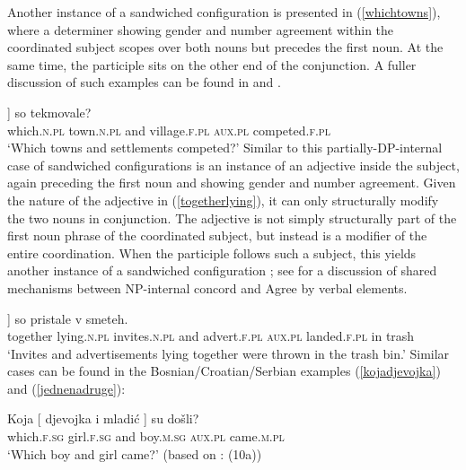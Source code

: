 \documentclass[output=paper
,modfonts
,nonflat]{langsci/langscibook}
\begin{document}
Another instance of a sandwiched configuration is presented in (\ref{whichtowns}), where a determiner showing gender and number agreement within the coordinated subject scopes over both nouns but precedes the first noun. At the same time, the participle sits on the other end of the conjunction. A fuller discussion of such examples can be found in \cite{begovicaljovic:15} and \cite{aljovicbegovic:16}. 

\ea \label{whichtowns}
\gll [ Katera [ mesta in vasi ]] so tekmovale?  \\
{} which.\textsc{n.pl} {} town.\textsc{n.pl} and village.\textsc{f.pl} {} \textsc{aux.pl} competed.\textsc{f.pl}\\
\glt `Which towns and settlements competed?'
\z
Similar to this partially-DP-internal case of sandwiched configurations is an instance of an adjective inside the subject, again preceding the first noun and showing gender and number agreement. Given the nature of the adjective in (\ref{togetherlying}), it can only structurally modify the two nouns in conjunction. The adjective is not simply  structurally part of the first noun phrase of the coordinated subject, but instead is a modifier of the entire coordination. When the participle follows such a subject, this yields another instance of a sandwiched configuration \citep{marusicetalnels:15}; see  for a discussion of shared mechanisms between NP-internal concord and Agree by verbal elements.

\ea \label{togetherlying}
\gll [ Skupaj  ležeča   [ vabila         in    reklame ]] so      pristale     v  smeteh. \\
{} together lying.\textsc{n.pl} {} invites.\textsc{n.pl} and advert.\textsc{f.pl} {} \textsc{aux.pl} landed.\textsc{f.pl} in trash\\
\glt `Invites and advertisements lying together were thrown in the trash bin.'
\z
Similar cases can be found in the Bosnian/Croatian/Serbian examples (\ref{kojadjevojka}) and (\ref{jednenadruge}):

\ea \label{kojadjevojka}
\gll Koja [ djevojka i mladić ] su došli? \\
which.\textsc{f.sg} {} girl.\textsc{f.sg} and boy.\textsc{m.sg} {} \textsc{aux.pl} came.\textsc{m.pl}\\
\glt `Which boy and girl came?' (based on \citealt{aljovicbegovic:16}: (10a))
\z
\end{document}
